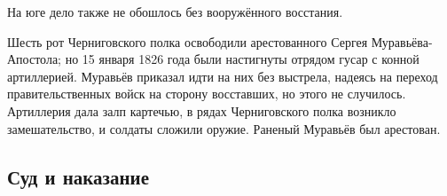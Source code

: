 \documentclass{article}
\begin{document}
На юге дело также не обошлось без вооружённого восстания.

Шесть рот Черниговского полка освободили арестованного Сергея Муравьёва-Апостола; но 15 января 1826 года были настигнуты отрядом гусар с конной артиллерией. Муравьёв приказал идти на них без выстрела, надеясь на переход правительственных войск на сторону восставших, но этого не случилось. Артиллерия дала залп картечью, в рядах Черниговского полка возникло замешательство, и солдаты сложили оружие. Раненый Муравьёв был арестован.

\subsection{Суд и наказание}
\end{document}
